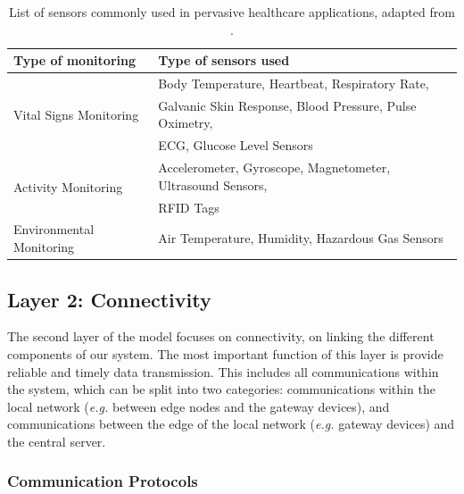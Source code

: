 \begin{table}[H]
    \centering
    \begin{tabular}{l|l}
        \textbf{Type of monitoring} & \textbf{Type of sensors used} \\ 
        \hline
        \multirow{3}{*}{Vital Signs Monitoring} & Body Temperature, Heartbeat, Respiratory Rate, \\ & Galvanic Skin Response, Blood Pressure, Pulse Oximetry, \\ & \acf{ECG}, Glucose Level Sensors \\ \hline
        \multirow{2}{*}{Activity Monitoring} & Accelerometer, Gyroscope, Magnetometer, Ultrasound Sensors,\\ & \acf{RFID} Tags\\
        \hline
        \multirow{1}{*}{Environmental Monitoring} & Air Temperature, Humidity, Hazardous Gas Sensors \\
    \end{tabular}
    \caption[List of sensors commonly used in pervasive healthcare applications]{List of sensors commonly used in pervasive healthcare applications, adapted from \cite{MinhDang2019}.}
    \label{tab:layer1-sensors}
\end{table}


\subsection{Layer 2: Connectivity}
\label{sec:iot-model-layer2}


The second layer of the model focuses on connectivity, on linking the different components of our system. The most important function of this layer is provide reliable and timely data transmission. This includes all communications within the system, which can be split into two categories: communications within the local network (\textit{e.g.} between edge nodes and the gateway devices), and communications between the edge of the local network (\textit{e.g.} gateway devices) and the central server. \bigskip

\subsubsection{Communication Protocols}

